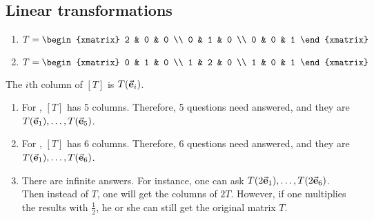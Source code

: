 \subsection{Linear transformations}

\begin{exercise}{4}
  \begin{enumerate}
    \item $T = \begin{xmatrix}
                 2 & 0 & 0 \\
                 0 & 1 & 0 \\
                 0 & 0 & 1
               \end{xmatrix}$

    \item $T = \begin{xmatrix}
                 0 & 1 & 0 \\
                 1 & 2 & 0 \\
                 1 & 0 & 1
               \end{xmatrix}$
  \end{enumerate}
\end{exercise}

\begin{exercise}{8}
  The $i$th column of $[T]$ is $T(\vec{\mathbf{e}}_i)$.

  \begin{enumerate}
    \item For , $[T]$ has 5 columns. Therefore,
          5 questions need answered, and they are $T(\vec{\mathbf{e}}_1), \hdots, T(\vec{\mathbf{e}}_5)$.

    \item For , $[T]$ has 6 columns. Therefore,
          6 questions need answered, and they are $T(\vec{\mathbf{e}}_1), \hdots, T(\vec{\mathbf{e}}_6)$.

    \item There are infinite answers. For instance, one can ask $T(2\vec{\mathbf{e}}_1), \hdots, T(2\vec{\mathbf{e}}_6)$.
          Then instead of $T$, one will get the columns of $2T$. However, if one
          multiplies the results with $\frac{1}{2}$, he or she can still get the
          original matrix $T$.
  \end{enumerate}
\end{exercise}


